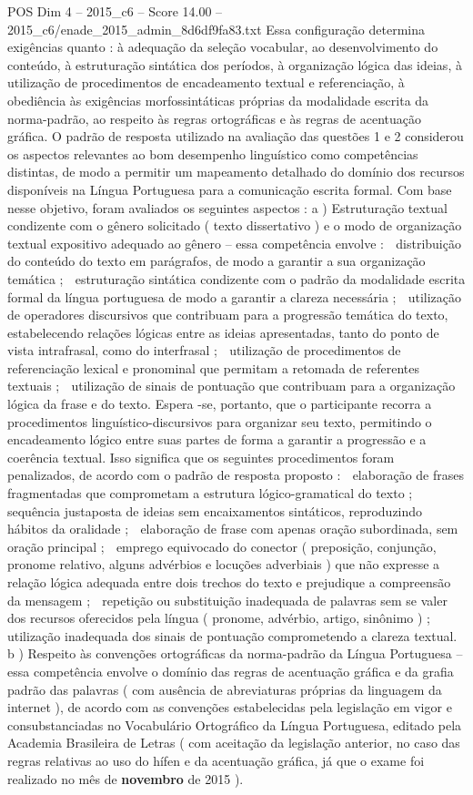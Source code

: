 \begin{textsample}{POS Dim 4 – 2015\_c6 – Score 14.00 – 2015\_c6/enade\_2015\_admin\_8d6df9fa83.txt}
Essa configuração determina exigências quanto : à adequação da seleção vocabular, ao desenvolvimento do conteúdo, à estruturação sintática dos períodos, à organização lógica das ideias, à utilização de procedimentos de encadeamento textual e referenciação, à obediência às exigências morfossintáticas próprias da modalidade escrita da norma-padrão, ao respeito às regras ortográficas e às regras de acentuação gráfica.
O padrão de resposta utilizado na avaliação das questões 1 e 2 considerou os aspectos relevantes ao bom desempenho linguístico como competências distintas, de modo a permitir um mapeamento detalhado do domínio dos recursos disponíveis na Língua Portuguesa para a comunicação escrita formal.
Com base nesse objetivo, foram avaliados os seguintes aspectos : a ) Estruturação textual condizente com o gênero solicitado ( texto dissertativo ) e o modo de organização textual expositivo adequado ao gênero – essa competência envolve :  distribuição do conteúdo do texto em parágrafos, de modo a garantir a sua organização temática ;  estruturação sintática condizente com o padrão da modalidade escrita formal da língua portuguesa de modo a garantir a clareza necessária ;  utilização de operadores discursivos que contribuam para a progressão temática do texto, estabelecendo relações lógicas entre as ideias apresentadas, tanto do ponto de vista intrafrasal, como do interfrasal ;  utilização de procedimentos de referenciação lexical e pronominal que permitam a retomada de referentes textuais ;  utilização de sinais de pontuação que contribuam para a organização lógica da frase e do texto.
Espera -se, portanto, que o participante recorra a procedimentos linguístico-discursivos para organizar seu texto, permitindo o encadeamento lógico entre suas partes de forma a garantir a progressão e a coerência textual.
Isso significa que os seguintes procedimentos foram penalizados, de acordo com o padrão de resposta proposto :  elaboração de frases fragmentadas que comprometam a estrutura lógico-gramatical do texto ;  sequência justaposta de ideias sem encaixamentos sintáticos, reproduzindo hábitos da oralidade ;  elaboração de frase com apenas oração subordinada, sem oração principal ;  emprego equivocado do conector ( preposição, conjunção, pronome relativo, alguns advérbios e locuções adverbiais ) que não expresse a relação lógica adequada entre dois trechos do texto e prejudique a compreensão da mensagem ;  repetição ou substituição inadequada de palavras sem se valer dos recursos oferecidos pela língua ( pronome, advérbio, artigo, sinônimo ) ;  utilização inadequada dos sinais de pontuação comprometendo a clareza textual. b ) Respeito às convenções ortográficas da norma-padrão da Língua Portuguesa – essa competência envolve o domínio das regras de acentuação gráfica e da grafia padrão das palavras ( com ausência de abreviaturas próprias da linguagem da internet ), de acordo com as convenções estabelecidas pela legislação em vigor e consubstanciadas no Vocabulário Ortográfico da Língua Portuguesa, editado pela Academia Brasileira de Letras ( com aceitação da legislação anterior, no caso das regras relativas ao uso do hífen e da acentuação gráfica, já que o exame foi realizado no mês de \textbf{novembro} de 2015 ).

\end{textsample}

